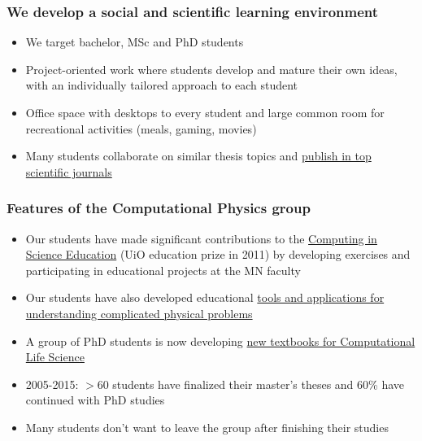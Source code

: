 \documentclass{beamer}
\begin{document}
\begin{frame}
\frametitle{We develop a social and scientific learning environment}

\begin{block}{}
\begin{itemize}
\item We target bachelor, MSc and PhD students

\item Project-oriented work where students develop and mature their own ideas, with an individually tailored approach to each student

\item Office space with desktops to every student and large common room for recreational activities (meals, gaming, movies)

\item Many students collaborate on similar  thesis topics and \href{{http://www.dn.no/talent/2014/06/12/Utdannelse/sommervikar-ble-toppforsker}}{publish in top scientific journals}
\end{itemize}

\noindent
\end{block}
\end{frame}

\begin{frame}
\frametitle{Features of the Computational Physics group}

\begin{block}{}
\begin{itemize}
\item Our students have made significant contributions to  the \href{{http://www.mn.uio.no/english/about/collaboration/cse/}}{Computing in Science Education}  (UiO education prize in 2011) by developing exercises and participating in educational projects at the MN faculty

\item Our students have also developed educational \href{{http://www.mn.uio.no/fysikk/om/aktuelt/aktuelle-saker/2015/realfagsapper.html}}{tools and applications for understanding complicated physical problems}

\item A group of PhD students is now developing \href{{https://github.com/CINPLA/ibvcse}}{new textbooks for Computational Life Science}

\item 2005-2015: $> 60$ students have finalized their master's theses and 60\% have continued with PhD studies

\item Many students don't want to leave the group after finishing their studies
\end{itemize}

\noindent
\end{block}
\end{frame}
\end{document}
